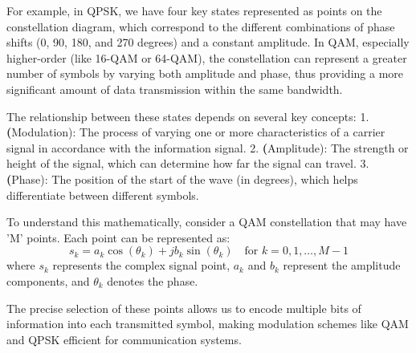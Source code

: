 For example, in QPSK, we have four key states represented as points on the constellation diagram, which correspond to the different combinations of phase shifts (0, 90, 180, and 270 degrees) and a constant amplitude. In QAM, especially higher-order (like 16-QAM or 64-QAM), the constellation can represent a greater number of symbols by varying both amplitude and phase, thus providing a more significant amount of data transmission within the same bandwidth.

The relationship between these states depends on several key concepts:
1. \textbf(Modulation): The process of varying one or more characteristics of a carrier signal in accordance with the information signal.
2. \textbf(Amplitude): The strength or height of the signal, which can determine how far the signal can travel.
3. \textbf(Phase): The position of the start of the wave (in degrees), which helps differentiate between different symbols.

To understand this mathematically, consider a QAM constellation that may have 'M' points. Each point can be represented as:
\[
s_k = a_k \cos(\theta_k) + j b_k \sin(\theta_k) \quad \text{for } k = 0, 1, \ldots, M-1
\]
where \( s_k \) represents the complex signal point, \( a_k \) and \( b_k \) represent the amplitude components, and \( \theta_k \) denotes the phase.

The precise selection of these points allows us to encode multiple bits of information into each transmitted symbol, making modulation schemes like QAM and QPSK efficient for communication systems.

